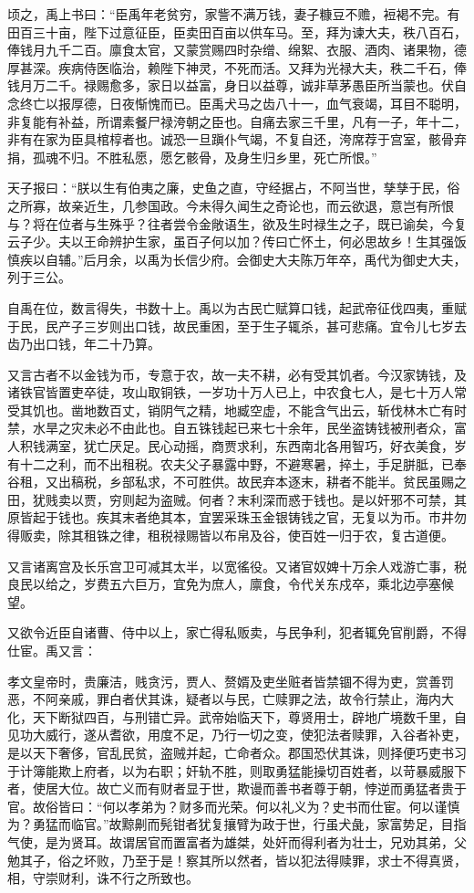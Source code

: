 \documentclass[]{article}
\begin{document}
顷之，禹上书曰：``臣禹年老贫穷，家訾不满万钱，妻子糠豆不赡，裋褐不完。有田百三十亩，陛下过意征臣，臣卖田百亩以供车马。至，拜为谏大夫，秩八百石，俸钱月九千二百。廪食太官，又蒙赏赐四时杂缯、绵絮、衣服、酒肉、诸果物，德厚甚深。疾病侍医临治，赖陛下神灵，不死而活。又拜为光禄大夫，秩二千石，俸钱月万二千。禄赐愈多，家日以益富，身日以益尊，诚非草茅愚臣所当蒙也。伏自念终亡以报厚德，日夜惭愧而已。臣禹犬马之齿八十一，血气衰竭，耳目不聪明，非复能有补益，所谓素餐尸禄洿朝之臣也。自痛去家三千里，凡有一子，年十二，非有在家为臣具棺椁者也。诚恐一旦蹎仆气竭，不复自还，洿席荐于宫室，骸骨弃捐，孤魂不归。不胜私愿，愿乞骸骨，及身生归乡里，死亡所恨。''

天子报曰：``朕以生有伯夷之廉，史鱼之直，守经据占，不阿当世，孳孳于民，俗之所寡，故亲近生，几参国政。今未得久闻生之奇论也，而云欲退，意岂有所恨与？将在位者与生殊乎？往者尝令金敞语生，欲及生时禄生之子，既已谕矣，今复云子少。夫以王命辨护生家，虽百子何以加？传曰亡怀土，何必思故乡！生其强饭慎疾以自辅。''后月余，以禹为长信少府。会御史大夫陈万年卒，禹代为御史大夫，列于三公。

自禹在位，数言得失，书数十上。禹以为古民亡赋算口钱，起武帝征伐四夷，重赋于民，民产子三岁则出口钱，故民重困，至于生子辄杀，甚可悲痛。宜令儿七岁去齿乃出口钱，年二十乃算。

又言古者不以金钱为币，专意于农，故一夫不耕，必有受其饥者。今汉家铸钱，及诸铁官皆置吏卒徒，攻山取铜铁，一岁功十万人已上，中农食七人，是七十万人常受其饥也。凿地数百丈，销阴气之精，地臧空虚，不能含气出云，斩伐林木亡有时禁，水旱之灾未必不由此也。自五铢钱起已来七十余年，民坐盗铸钱被刑者众，富人积钱满室，犹亡厌足。民心动摇，商贾求利，东西南北各用智巧，好衣美食，岁有十二之利，而不出租税。农夫父子暴露中野，不避寒暑，捽土，手足胼胝，已奉谷租，又出稿税，乡部私求，不可胜供。故民弃本逐末，耕者不能半。贫民虽赐之田，犹贱卖以贾，穷则起为盗贼。何者？末利深而惑于钱也。是以奸邪不可禁，其原皆起于钱也。疾其末者绝其本，宜罢采珠玉金银铸钱之官，无复以为币。市井勿得贩卖，除其租铢之律，租税禄赐皆以布帛及谷，使百姓一归于农，复古道便。

又言诸离宫及长乐宫卫可减其太半，以宽徭役。又诸官奴婢十万余人戏游亡事，税良民以给之，岁费五六巨万，宜免为庶人，廪食，令代关东戍卒，乘北边亭塞候望。

又欲令近臣自诸曹、侍中以上，家亡得私贩卖，与民争利，犯者辄免官削爵，不得仕宦。禹又言：

孝文皇帝时，贵廉洁，贱贪污，贾人、赘婿及吏坐赃者皆禁锢不得为吏，赏善罚恶，不阿亲戚，罪白者伏其诛，疑者以与民，亡赎罪之法，故令行禁止，海内大化，天下断狱四百，与刑错亡异。武帝始临天下，尊贤用士，辟地广境数千里，自见功大威行，遂从耆欲，用度不足，乃行一切之变，使犯法者赎罪，入谷者补吏，是以天下奢侈，官乱民贫，盗贼并起，亡命者众。郡国恐伏其诛，则择便巧吏书习于计簿能欺上府者，以为右职；奸轨不胜，则取勇猛能操切百姓者，以苛暴威服下者，使居大位。故亡义而有财者显于世，欺谩而善书者尊于朝，悖逆而勇猛者贵于官。故俗皆曰：``何以孝弟为？财多而光荣。何以礼义为？史书而仕宦。何以谨慎为？勇猛而临官。''故黥劓而髡钳者犹复攘臂为政于世，行虽犬彘，家富势足，目指气使，是为贤耳。故谓居官而置富者为雄桀，处奸而得利者为壮士，兄劝其弟，父勉其子，俗之坏败，乃至于是！察其所以然者，皆以犯法得赎罪，求士不得真贤，相，守崇财利，诛不行之所致也。
\end{document}
